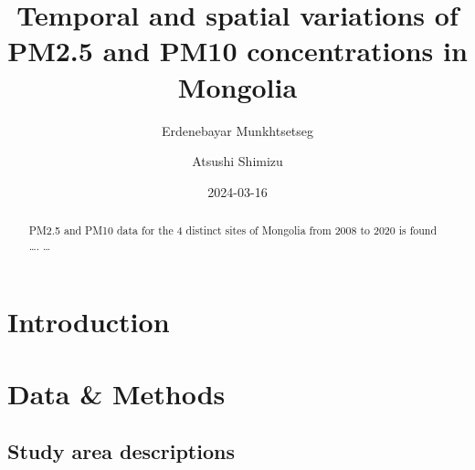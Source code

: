 \documentclass[
  letterpaper,
  DIV=11,
  numbers=noendperiod]{scrartcl}
\title{Temporal and spatial variations of PM2.5 and PM10 concentrations
in Mongolia}
\author{Erdenebayar Munkhtsetseg \and Atsushi Shimizu}
\date{2024-03-16}
\begin{document}
\maketitle
\begin{abstract}
PM2.5 and PM10 data for the 4 distinct sites of Mongolia from 2008 to
2020 is found \ldots. \ldots{}
\end{abstract}

\section{Introduction}\label{introduction}

\section{Data \& Methods}\label{sec-data-methods}

\subsection{Study area descriptions}\label{study-area-descriptions}
\end{document}
